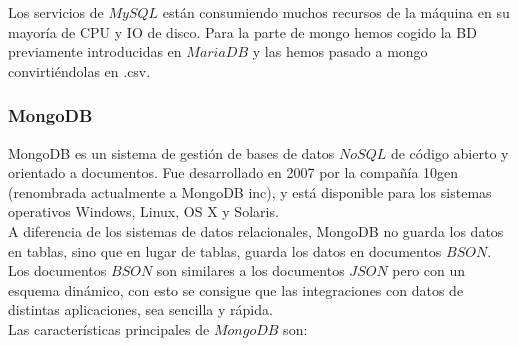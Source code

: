 \documentclass[12pt,a4paper]{article}
\begin{document}
Los servicios de $MySQL$ están consumiendo muchos recursos de la máquina en su mayoría de CPU y IO de disco.
Para la parte de mongo hemos cogido la BD previamente introducidas en $MariaDB$ y las hemos pasado a mongo convirtiéndolas en .csv.


\subsubsection{MongoDB} \label{pto511}

MongoDB es un sistema de gestión de bases de datos $NoSQL$ de código abierto y orientado a documentos. Fue desarrollado en 2007 por la compañía 10gen (renombrada actualmente a MongoDB inc), y está disponible para los sistemas operativos Windows, Linux, OS X y Solaris. \\

A diferencia de los sistemas de datos relacionales, MongoDB no guarda los datos en tablas, sino que en lugar de tablas, guarda los datos en documentos $BSON$. Los documentos $BSON$ son similares a los documentos $JSON$ pero con un esquema dinámico, con esto se consigue que las integraciones con datos de distintas aplicaciones, sea sencilla y rápida. \\


Las características principales de $MongoDB$ son:
\end{document}
